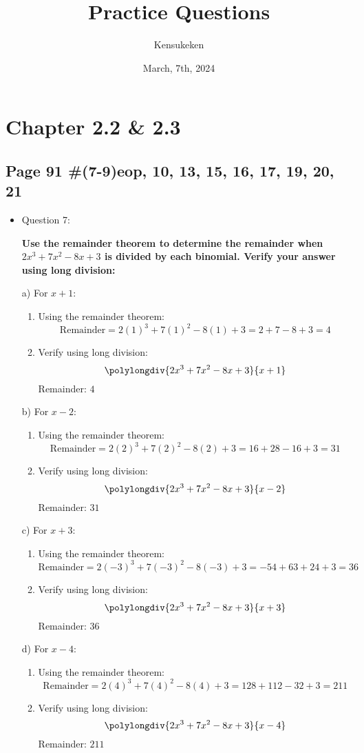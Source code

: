 \documentclass{article}
\title{Practice Questions}
\author{Kensukeken}
\date{March, 7th, 2024}
\begin{document}
\maketitle
\section*{Chapter 2.2 \& 2.3}
\subsection*{Page 91 \#(7-9)eop, 10, 13, 15, 16, 17, 19, 20, 21}
\begin{itemize}
\item Question 7:

\textbf{Use the remainder theorem to determine the remainder when \(2x^3 + 7x^2 - 8x + 3\) is divided by each binomial. Verify your answer using long division:}

a) For \(x + 1\):
\begin{enumerate}
    \item Using the remainder theorem:
    \[
    \text{Remainder} = 2(1)^3 + 7(1)^2 - 8(1) + 3 = 2 + 7 - 8 + 3 = 4
    \]
    \item Verify using long division:
    \[
    \polylongdiv{2x^3 + 7x^2 - 8x + 3}{x + 1}
    \]
    Remainder: \(4\)
\end{enumerate}

b) For \(x - 2\):
\begin{enumerate}
    \item Using the remainder theorem:
    \[
    \text{Remainder} = 2(2)^3 + 7(2)^2 - 8(2) + 3 = 16 + 28 - 16 + 3 = 31
    \]
    \item Verify using long division:
    \[
    \polylongdiv{2x^3 + 7x^2 - 8x + 3}{x - 2}
    \]
    Remainder: \(31\)
\end{enumerate}

c) For \(x + 3\):
\begin{enumerate}
    \item Using the remainder theorem:
    \[
    \text{Remainder} = 2(-3)^3 + 7(-3)^2 - 8(-3) + 3 = -54 + 63 + 24 + 3 = 36
    \]
    \item Verify using long division:
    \[
    \polylongdiv{2x^3 + 7x^2 - 8x + 3}{x + 3}
    \]
    Remainder: \(36\)
\end{enumerate}

d) For \(x - 4\):
\begin{enumerate}
    \item Using the remainder theorem:
    \[
    \text{Remainder} = 2(4)^3 + 7(4)^2 - 8(4) + 3 = 128 + 112 - 32 + 3 = 211
    \]
    \item Verify using long division:
    \[
    \polylongdiv{2x^3 + 7x^2 - 8x + 3}{x - 4}
    \]
    Remainder: \(211\)
\end{enumerate}


\end{itemize}
\end{document}
